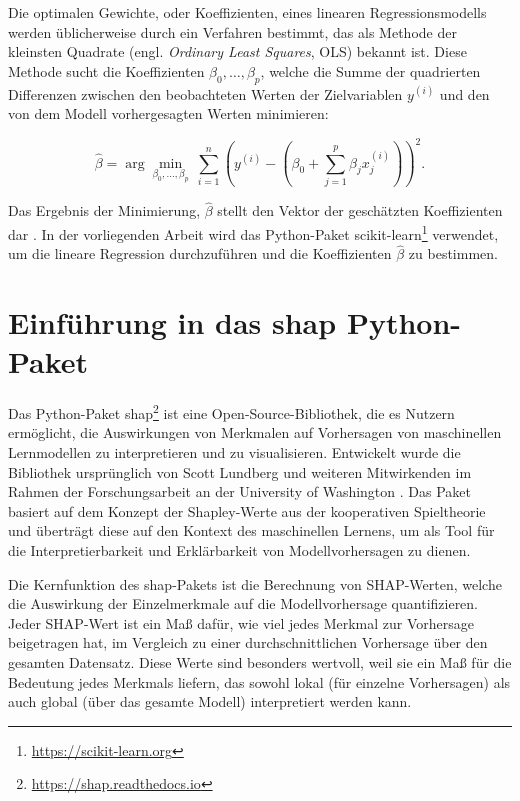 Die optimalen Gewichte, oder Koeffizienten, eines linearen Regressionsmodells werden üblicherweise durch ein Verfahren bestimmt, 
das als Methode der kleinsten Quadrate (engl. \textit{Ordinary Least Squares}, OLS) bekannt ist. 
Diese Methode sucht die Koeffizienten \( \beta_0, \ldots, \beta_p \), welche die Summe der quadrierten 
Differenzen zwischen den beobachteten Werten der Zielvariablen \( y^{(i)} \) und den von dem Modell 
vorhergesagten Werten minimieren:

\begin{equation}
    \hat{\beta} = \arg \underset{\beta_0, \ldots, \beta_p}{\min} \ \sum_{i=1}^{n} \left( y^{(i)} - \left( \beta_0 + \sum_{j=1}^{p} \beta_j x_j^{(i)}\right)\right)^2.
\end{equation}

Das Ergebnis der Minimierung, \( \hat{\beta} \) stellt den Vektor der geschätzten Koeffizienten dar \cite[S. 37]{Molnar_2022}. 
In der vorliegenden Arbeit wird das Python-Paket \textsf{scikit-learn}\footnote{\url{https://scikit-learn.org}} verwendet, um die lineare Regression durchzuführen und die Koeffizienten 
\( \hat{\beta} \) zu bestimmen. 


\section{Einführung in das \textsf{shap} Python-Paket}
\label{sec:shap-package}

Das Python-Paket \textsf{shap}\footnote{\url{https://shap.readthedocs.io}} ist eine Open-Source-Bibliothek, die es Nutzern ermöglicht, 
die Auswirkungen von Merkmalen auf Vorhersagen von maschinellen Lernmodellen zu interpretieren und zu visualisieren. 
Entwickelt wurde die Bibliothek ursprünglich von Scott Lundberg und weiteren Mitwirkenden im Rahmen der Forschungsarbeit 
an der University of Washington \cite{NIPS2017_8a20a862}. Das Paket basiert auf dem Konzept der Shapley-Werte aus der kooperativen Spieltheorie 
und überträgt diese auf den Kontext des maschinellen Lernens, um als Tool für die Interpretierbarkeit und Erklärbarkeit 
von Modellvorhersagen zu dienen.

Die Kernfunktion des \textsf{shap}-Pakets ist die Berechnung von SHAP-Werten, welche die Auswirkung der 
Einzelmerkmale auf die Modellvorhersage quantifizieren. Jeder SHAP-Wert ist ein Maß dafür, wie viel jedes Merkmal 
zur Vorhersage beigetragen hat, im Vergleich zu einer durchschnittlichen Vorhersage über den gesamten Datensatz. 
Diese Werte sind besonders wertvoll, weil sie ein Maß für die Bedeutung jedes Merkmals liefern, 
das sowohl lokal (für einzelne Vorhersagen) als auch global (über das gesamte Modell) interpretiert werden kann.

